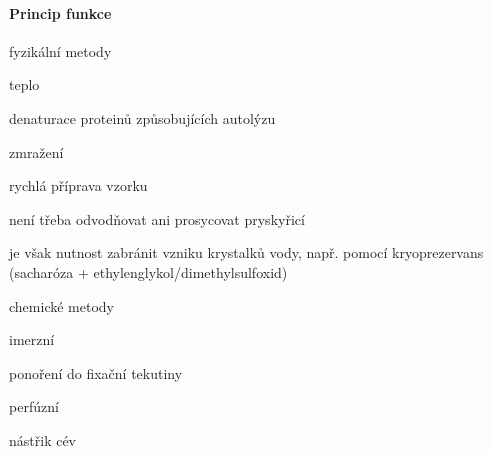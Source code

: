 \documentclass[DIV=8]{scrreprt}
\begin{document}
\paragraph{Princip funkce}
\begin{myItemize}[nosep]
    \item fyzikální metody
\begin{myItemize}[nosep]
    \item teplo
\begin{myItemize}[nosep]
    \item denaturace proteinů způsobujících autolýzu
\end{myItemize}

    \item zmražení
\begin{myItemize}[nosep]
    \item rychlá příprava vzorku
    \item není třeba odvodňovat ani prosycovat pryskyřicí
    \item je však nutnost zabránit vzniku krystalků vody, např. pomocí kryoprezervans (sacharóza + ethylenglykol/dimethylsulfoxid)
\end{myItemize}

\end{myItemize}

    \item chemické metody
\begin{myItemize}[nosep]
    \item imerzní
\begin{myItemize}[nosep]
    \item ponoření do fixační tekutiny
\end{myItemize}

    \item perfúzní
\begin{myItemize}[nosep]
    \item nástřik cév
\end{myItemize}

\end{myItemize}

\end{myItemize}
\end{document}
